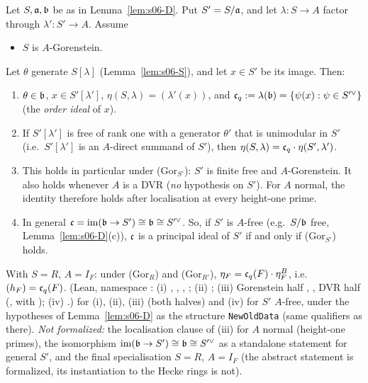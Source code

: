 \begin{theorem}\label{thm:s06-E}
Let $S,\mathfrak{a},\mathfrak{b}$ be as in Lemma~\ref{lem:s06-D}. Put $S'=S/\mathfrak{a}$, and let $\lambda:S\to A$ factor through $\lambda':S'\to A$. Assume
\begin{itemize}
\item[(Gor$_S$)] $S$ is $A$-Gorenstein.
\end{itemize}
Let $\theta$ generate $S[\lambda]$ (Lemma~\ref{lem:s06-S}), and let $x\in S'$ be its image. Then:
\begin{enumerate}[label=(\roman*)]
\item $\theta\in\mathfrak{b}$, $x\in S'[\lambda']$, $\eta(S,\lambda)=(\lambda'(x))$, and $\mathfrak{c}_q:=\lambda(\mathfrak{b})=\{\psi(x):\psi\in S'^\vee\}$ (the
  \emph{order ideal} of $x$).
\item If $S'[\lambda']$ is free of rank one with a generator $\theta'$ that is unimodular in $S'$ (i.e.\ $S'[\lambda']$ is an
  $A$-direct summand of $S'$), then $\eta(S,\lambda)=\mathfrak{c}_q\cdot\eta(S',\lambda')$.
\item This holds in particular under (Gor$_{S'}$): $S'$ is finite free and $A$-Gorenstein. It also holds whenever $A$ is a DVR
  (\emph{no} hypothesis on $S'$). For $A$ normal, the identity therefore holds after localisation at every height-one prime.
\item In general $\mathfrak{c}=\mathrm{im}(\mathfrak{b}\to S')\cong\mathfrak{b}\cong S'^\vee$. So, if $S'$ is $A$-free (e.g.\ $S/\mathfrak{b}$ free, Lemma~\ref{lem:s06-D}(c)), $\mathfrak{c}$ is a principal ideal of $S'$ if and only if
  (Gor$_{S'}$) holds.
\end{enumerate}
With $S=R$, $A=I_F$: under (Gor$_R$) and (Gor$_{R'}$), $\eta_F=\mathfrak{c}_q(F)\cdot\eta^B_F$, i.e.\ $(h_F)=\mathfrak{c}_q(F)$. \stproved{}
(Lean, namespace : (i) , , , ;
(ii) ;
(iii) Gorenstein half , , DVR half  (, with );
(iv) .)
\stformalized{} for (i), (ii), (iii) (both halves) and (iv) for $S'$ $A$-free, under the hypotheses of Lemma~\ref{lem:s06-D} as the structure \texttt{NewOldData} (same qualifiers as there). \emph{Not formalized:} the localisation clause of (iii) for $A$ normal (height-one primes), the isomorphism $\mathrm{im}(\mathfrak{b}\to S')\cong\mathfrak{b}\cong S'^\vee$ as a standalone statement for general $S'$, and the final specialisation $S=R$, $A=I_F$ (the abstract statement is formalized, its instantiation to the Hecke rings is not).
\end{theorem}
